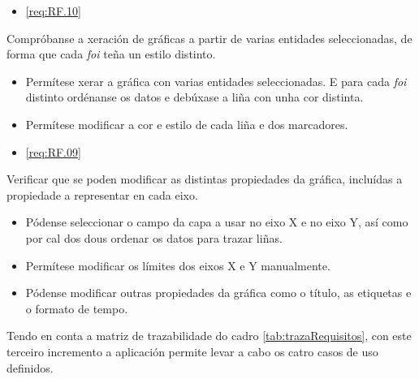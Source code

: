 		  {\begin{itemize}\item \ref{req:RF.10} \\\end{itemize}} %
		  {Compróbanse a xeración de gráficas a partir de varias entidades seleccionadas, de forma que cada \emph{foi} teña un estilo distinto.} %
		  {\begin{itemize}
		  \item Permítese xerar a gráfica con varias entidades seleccionadas. E para cada \emph{foi} distinto ordénanse os datos e debúxase a liña con unha cor distinta.
		  \item Permítese modificar a cor e estilo de cada liña e dos marcadores.
		  \end{itemize}} %
		  
		  {\begin{itemize}\item \ref{req:RF.09} \\\end{itemize}} %
		  {Verificar que se poden modificar as distintas propiedades da gráfica, incluídas a propiedade a representar en cada eixo.} %
		  {\begin{itemize}
		  \item Pódense seleccionar o campo da capa a usar no eixo X e no eixo Y, así como por cal dos dous ordenar os datos para trazar liñas.
		  \item Permítese modificar os límites dos eixos X e Y manualmente.
		  \item Pódense modificar outras propiedades da gráfica como o título, as etiquetas e o formato de tempo.
		  \end{itemize}} %
		  
Tendo en conta a matriz de trazabilidade do cadro \ref{tab:trazaRequisitos}, con este terceiro incremento a aplicación permite levar a cabo os catro casos de uso definidos.